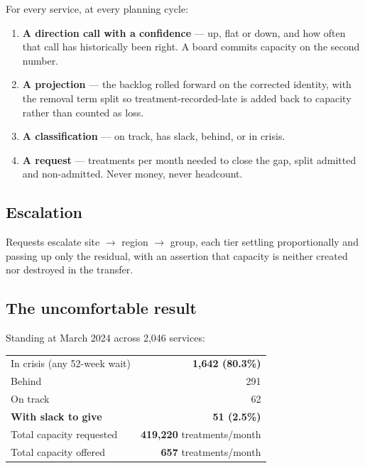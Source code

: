\documentclass[11pt,a4paper]{article}
\begin{document}
For every service, at every planning cycle:

\begin{enumerate}[leftmargin=1.5em]
\item \textbf{A direction call with a confidence} --- up, flat or down, and how often that call has
historically been right. A board commits capacity on the second number.
\item \textbf{A projection} --- the backlog rolled forward on the corrected identity, with the removal
term split so treatment-recorded-late is added back to capacity rather than counted as loss.
\item \textbf{A classification} --- on track, has slack, behind, or in crisis.
\item \textbf{A request} --- treatments per month needed to close the gap, split admitted and
non-admitted. Never money, never headcount.
\end{enumerate}

\subsection{Escalation}

Requests escalate site $\rightarrow$ region $\rightarrow$ group, each tier settling proportionally and
passing up only the residual, with an assertion that capacity is neither created nor destroyed in the
transfer.

\subsection{The uncomfortable result}

Standing at March 2024 across 2{,}046 services:

\begin{center}
\begin{tabular}{@{}lr@{}}
\toprule
In crisis (any 52-week wait) & \textbf{1{,}642 (80.3\%)} \\
Behind & 291 \\
On track & 62 \\
\textbf{With slack to give} & \textbf{51 (2.5\%)} \\
\midrule
Total capacity requested & \textbf{419{,}220} treatments/month \\
Total capacity offered & \textbf{657} treatments/month \\
\bottomrule
\end{tabular}
\end{center}
\end{document}
